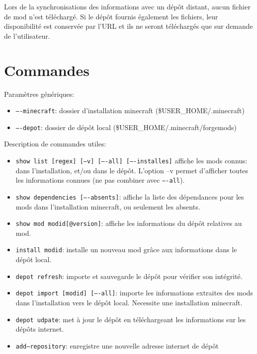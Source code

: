 \documentclass{article}
\begin{document}
Lors de la synchronisations des informations avec un dépôt distant, aucun fichier de mod n'est téléchargé.
Si le dépôt fournis également les fichiers, leur disponibilité est conservée par l'URL et ils ne seront téléchargés que sur demande de l'utilisateur.


\section{Commandes}
Paramètres génériques:
\begin{itemize}
    \item \texttt{----minecraft}: dossier d'installation minecraft (\$USER\_HOME/.minecraft)
    \item \texttt{----depot}: dossier de dépôt local (\$USER\_HOME/.minecraft/forgemods)
\end{itemize}

\medskip
Description de commandes utiles:
\begin{itemize}
    \item \texttt{show list [regex] [--v] [----all] [----installes]} affiche les mods connus: dans l'installation, et/ou dans le dépôt.
L'option --v permet d'afficher toutes les informations connues (ne pas combiner avec \texttt{----all}).
    \item \texttt{show dependencies [----absents]}: affiche la liste des dépendances pour les mods dans l'installation minecraft, ou seulement les absents.
    \item \texttt{show mod modid[@version]}: affiche les informations du dépôt relatives au mod.
    \item \texttt{install modid}: installe un nouveau mod grâce aux informations dans le dépôt local.
    \item \texttt{depot refresh}: importe et sauvegarde le dépôt pour vérifier son intégrité.
    \item \texttt{depot import [modid] [----all]}: importe les informations extraites des mods dans l'installation vers le dépôt local.
Necessite une installation minecraft.
    \item \texttt{depot udpate}: met à jour le dépôt en téléchargeant les informations sur les dépôts internet.
    \item \texttt{add--repository}: enregistre une nouvelle adresse internet de dépôt
\end{itemize}
\end{document}

